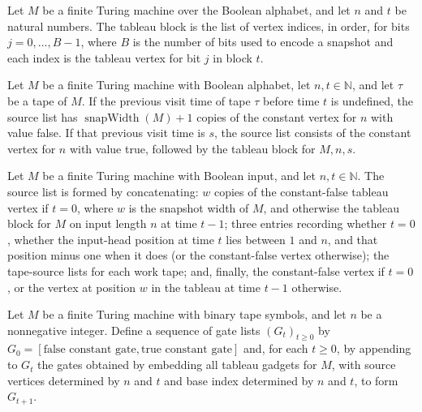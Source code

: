 \begin{definition}
\label{Complexity.tableauBlock}
\leanok
{}
Let $M$ be a finite Turing machine over the Boolean alphabet, and let $n$ and $t$ be
natural numbers. The tableau block is the list of vertex indices, in order, for bits
$j=0,\ldots,B-1$, where $B$ is the number of bits used to encode a snapshot and each
index is the tableau vertex for bit $j$ in block $t$.
\end{definition}

\begin{definition}
\label{Complexity.tableauTapeSources}
\leanok
{}
Let $M$ be a finite Turing machine with Boolean alphabet, let $n,t\in\mathbb{N}$, and
let $\tau$ be a tape of $M$. If the previous visit time of tape $\tau$ before time $t$
is undefined, the source list has $\operatorname{snapWidth}(M)+1$ copies of the constant
vertex for $n$ with value false. If that previous visit time is $s$, the source list
consists of the constant vertex for $n$ with value true, followed by the tableau block
for $M,n,s$.
\end{definition}

\begin{definition}
\label{Complexity.tableauSources}
\leanok
{}
Let $M$ be a finite Turing machine with Boolean input, and let $n,t\in\mathbb{N}$. The
source list is formed by concatenating: $w$ copies of the constant-false tableau vertex
if $t=0$, where $w$ is the snapshot width of $M$, and otherwise the tableau block for
$M$ on input length $n$ at time $t-1$; three entries recording whether $t=0$, whether
the input-head position at time $t$ lies between $1$ and $n$, and that position minus
one when it does (or the constant-false vertex otherwise); the tape-source lists for
each work tape; and, finally, the constant-false vertex if $t=0$, or the vertex at
position $w$ in the tableau at time $t-1$ otherwise.
\end{definition}

\begin{definition}
\label{Complexity.tableauGates}
\leanok
{}
Let $M$ be a finite Turing machine with binary tape symbols, and let $n$ be a
nonnegative integer. Define a sequence of gate lists $(G_t)_{t\ge 0}$ by
$G_0=[\text{false constant gate},\text{true constant gate}]$ and, for each $t\ge 0$, by
appending to $G_t$ the gates obtained by embedding all tableau gadgets for $M$, with
source vertices determined by $n$ and $t$ and base index determined by $n$ and $t$, to
form $G_{t+1}$.
\end{definition}

